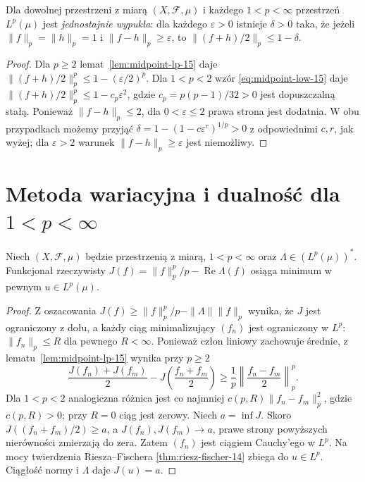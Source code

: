\begin{twierdzenie}
\label{thm:uniform-convexity-15}
Dla dowolnej przestrzeni z miarą $(X,\mathcal F,\mu)$
i każdego $1<p<\infty$ przestrzeń $L^p(\mu)$ jest
\emph{jednostajnie wypukła}: dla każdego $\varepsilon>0$
istnieje $\delta>0$ taka, że jeżeli $\|f\|_p=\|h\|_p=1$
i $\|f-h\|_p\ge\varepsilon$, to
$\|(f+h)/2\|_p\le1-\delta$.
\end{twierdzenie}
\begin{proof}
Dla $p\ge2$ lemat~\ref{lem:midpoint-lp-15} daje
$\|(f+h)/2\|_p^p\le1-(\varepsilon/2)^p$.
Dla $1<p<2$ wzór \eqref{eq:midpoint-low-15} daje
$\|(f+h)/2\|_p^p\le1-c_p\varepsilon^2$,
gdzie $c_p=p(p-1)/32>0$ jest dopuszczalną stałą.
Ponieważ $\|f-h\|_p\le2$, dla $0<\varepsilon\le2$
prawa strona jest dodatnia. W obu przypadkach
możemy przyjąć $\delta=1-(1-c\varepsilon^r)^{1/p}>0$
z odpowiednimi $c,r$, jak wyżej; dla $\varepsilon>2$
warunek $\|f-h\|_p\ge\varepsilon$ jest niemożliwy.
\end{proof}

\section{Metoda wariacyjna i dualność dla \texorpdfstring{$1<p<\infty$}{1 < p < ∞}}
\begin{lemat}
\label{lem:variational-lp-15}
Niech $(X,\mathcal F,\mu)$ będzie przestrzenią z miarą,
$1<p<\infty$ oraz $\Lambda\in(L^p(\mu))^*$.
Funkcjonał rzeczywisty
$J(f)=\|f\|_p^p/p-\operatorname{Re}\Lambda(f)$
osiąga minimum w pewnym $u\in L^p(\mu)$.
\end{lemat}
\begin{proof}
Z oszacowania $J(f)\ge\|f\|_p^p/p-\|\Lambda\|\|f\|_p$
wynika, że $J$ jest ograniczony z dołu, a każdy ciąg
minimalizujący $(f_n)$ jest ograniczony w $L^p$:
$\|f_n\|_p\le R$ dla pewnego $R<\infty$.
Ponieważ człon liniowy zachowuje średnie, z
lematu~\ref{lem:midpoint-lp-15} wynika przy $p\ge2$
\[
\frac{J(f_n)+J(f_m)}2-J\left(\frac{f_n+f_m}{2}\right)
\ge\frac1p\left\|\frac{f_n-f_m}{2}\right\|_p^p.
\]
Dla $1<p<2$ analogiczna różnica jest co najmniej
$c(p,R)\|f_n-f_m\|_p^2$, gdzie $c(p,R)>0$;
przy $R=0$ ciąg jest zerowy. Niech $a=\inf J$.
Skoro $J((f_n+f_m)/2)\ge a$, a $J(f_n),J(f_m)\to a$,
prawe strony powyższych nierówności zmierzają do zera.
Zatem $(f_n)$ jest ciągiem Cauchy'ego w $L^p$.
Na mocy twierdzenia Riesza--Fischera
\ref{thm:riesz-fischer-14} zbiega do $u\in L^p$.
Ciągłość normy i $\Lambda$ daje $J(u)=a$.
\end{proof}

